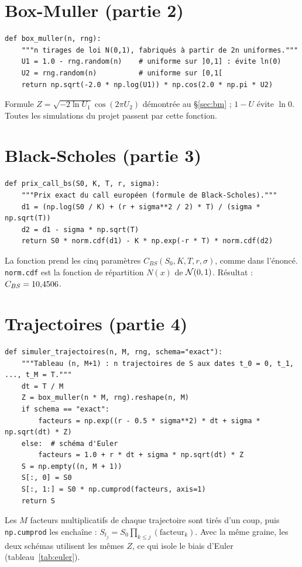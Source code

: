 \section*{Box-Muller (partie 2)}
\begin{lstlisting}
def box_muller(n, rng):
    """n tirages de loi N(0,1), fabriqués à partir de 2n uniformes."""
    U1 = 1.0 - rng.random(n)    # uniforme sur ]0,1] : évite ln(0)
    U2 = rng.random(n)          # uniforme sur [0,1[
    return np.sqrt(-2.0 * np.log(U1)) * np.cos(2.0 * np.pi * U2)
\end{lstlisting}
Formule $Z = \sqrt{-2\ln U_1}\cos(2\pi U_2)$ démontrée au §\ref{sec:bm} ; $1-U$ évite $\ln 0$. Toutes les simulations du projet passent par cette fonction.

\section*{Black-Scholes (partie 3)}
\begin{lstlisting}
def prix_call_bs(S0, K, T, r, sigma):
    """Prix exact du call européen (formule de Black-Scholes)."""
    d1 = (np.log(S0 / K) + (r + sigma**2 / 2) * T) / (sigma * np.sqrt(T))
    d2 = d1 - sigma * np.sqrt(T)
    return S0 * norm.cdf(d1) - K * np.exp(-r * T) * norm.cdf(d2)
\end{lstlisting}
La fonction prend les cinq paramètres $C_{BS}(S_0, K, T, r, \sigma)$, comme dans l'énoncé. \texttt{norm.cdf} est la fonction de répartition $N(x)$ de $\mathcal{N}(0,1)$. Résultat : $C_{BS} = 10{,}4506$.

\section*{Trajectoires (partie 4)}
\begin{lstlisting}
def simuler_trajectoires(n, M, rng, schema="exact"):
    """Tableau (n, M+1) : n trajectoires de S aux dates t_0 = 0, t_1, ..., t_M = T."""
    dt = T / M
    Z = box_muller(n * M, rng).reshape(n, M)
    if schema == "exact":
        facteurs = np.exp((r - 0.5 * sigma**2) * dt + sigma * np.sqrt(dt) * Z)
    else:  # schéma d'Euler
        facteurs = 1.0 + r * dt + sigma * np.sqrt(dt) * Z
    S = np.empty((n, M + 1))
    S[:, 0] = S0
    S[:, 1:] = S0 * np.cumprod(facteurs, axis=1)
    return S
\end{lstlisting}
Les $M$ facteurs multiplicatifs de chaque trajectoire sont tirés d'un coup, puis \texttt{np.cumprod} les enchaîne : $S_{t_j} = S_0\prod_{k\le j}(\text{facteur}_k)$. Avec la même graine, les deux schémas utilisent les mêmes $Z$, ce qui isole le biais d'Euler (tableau~\ref{tab:euler}).

